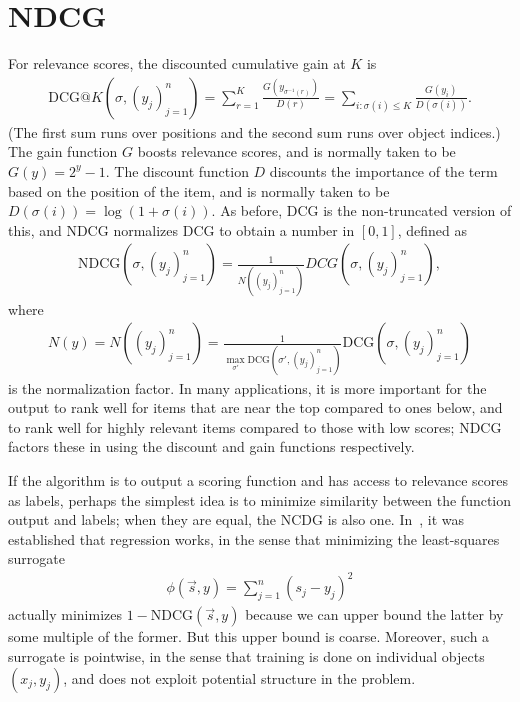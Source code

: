 \section{NDCG}
\label{sec:ndcg}
For relevance scores, the discounted cumulative gain at $K$ is 
\begin{align*}
  \text{DCG}@K(\sigma, (y_j)_{j=1}^n)
  = \sum_{r=1}^K \frac{G(y_{\sigma^{-1}(r)})}{D(r)}
  = \sum_{i: \sigma(i) \leq K} \frac{G(y_i)}{D(\sigma(i))}.
\end{align*}
(The first sum runs over positions and the second sum runs over
object indices.) The gain function $G$ boosts relevance scores, and is
normally taken to be $G(y) = 2^y - 1$. The discount function $D$ discounts
the importance of the term based on the position of the item, and is
normally taken to be $D(\sigma(i)) = \log(1 + \sigma(i))$. As before, DCG
is the non-truncated version of this, and NDCG normalizes DCG to obtain
a number in $[0,1]$, defined as
\begin{align*}
  \text{NDCG}(\sigma, (y_j)_{j=1}^n)
  = \frac{1}{N((y_j)_{j=1}^n)} DCG(\sigma, (y_j)_{j=1}^n),
\end{align*}
where
\begin{align*}
  N(y) = N((y_j)_{j=1}^n)
  = \frac{1}{\max_{\sigma'} \text{DCG}(\sigma', (y_j)_{j=1}^n)} \text{DCG}(\sigma, (y_j)_{j=1}^n)
\end{align*}
is the normalization factor. 
In many applications, it is more important for the output to rank well for
items that are near the top compared to ones below, and to rank well for
highly relevant items compared to those with low scores; NDCG factors
these in using the discount and gain functions respectively.

If the algorithm is to output a scoring function and has access to relevance
scores as labels, perhaps the simplest idea is to minimize similarity between
the function output and labels; when they are equal, the NCDG is also one.
In~\cite{bayes-optimal-subset-ranking}, it was
established that regression works, in the sense that minimizing the least-squares
surrogate
\begin{align*}
  \phi(\vec{s}, y) = \sum_{j=1}^n {(s_j - y_j)}^2
\end{align*}
actually minimizes $1 - \text{NDCG}(\vec{s}, y)$ because we can upper bound
the latter by some multiple of the former. But this upper bound is coarse.
Moreover, such a surrogate is pointwise, in the sense
that training is done on individual objects $(x_j, y_j)$, and does not
exploit potential structure in the problem.

